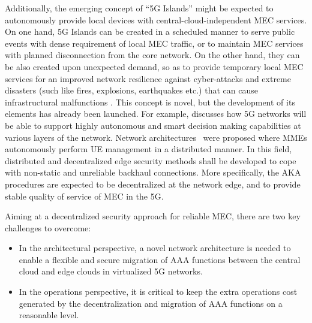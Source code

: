 \documentclass{ieeeaccess}
\newcommand{\change}[1]{#1}
\begin{document}
	Additionally, the emerging concept of ``5G Islands'' \cite{han2018island,kochems2018ammcoa} might be expected %
	 \change{to autonomously provide local devices with central-cloud-independent MEC services.}
	\change{On one hand, 5G Islands can be created in a scheduled manner to serve public events with dense requirement of local MEC traffic, or to maintain MEC services with planned disconnection from the core network. On the other hand, they can be also created upon unexpected demand, so as to provide temporary local MEC services for an improved network resilience against cyber-attacks and extreme disasters (such like fires, explosions, earthquakes etc.) that can cause infrastructural malfunctions .
	This concept is novel, but the development of its elements has already been launched. For example, \cite{simsek2017flexibility} discusses how 5G networks will be able to support highly autonomous and smart decision making capabilities at various layers of the network.
	Network architectures~\cite{yang2016autonomous,jeon2017distributed} were proposed where MMEs autonomously perform UE management in a distributed manner. In this field, distributed \change{and decentralized} edge security methods shall be developed to cope with non-static and unreliable backhaul connections. More specifically, the AKA procedures are expected to be decentralized at the network edge, and to provide stable quality of service of MEC in the 5G.}
	
	\change{Aiming at a decentralized security approach for reliable MEC, there are two key challenges to overcome:
	\begin{itemize}
		\item In the architectural perspective, a novel network architecture is needed to enable a flexible and secure migration of AAA functions between the central cloud and edge clouds in virtualized 5G networks. 
		\item In the operations perspective, it is critical to keep the extra operations cost generated by the decentralization and migration of AAA functions on a reasonable level.
	\end{itemize}
	}
	
\end{document}
